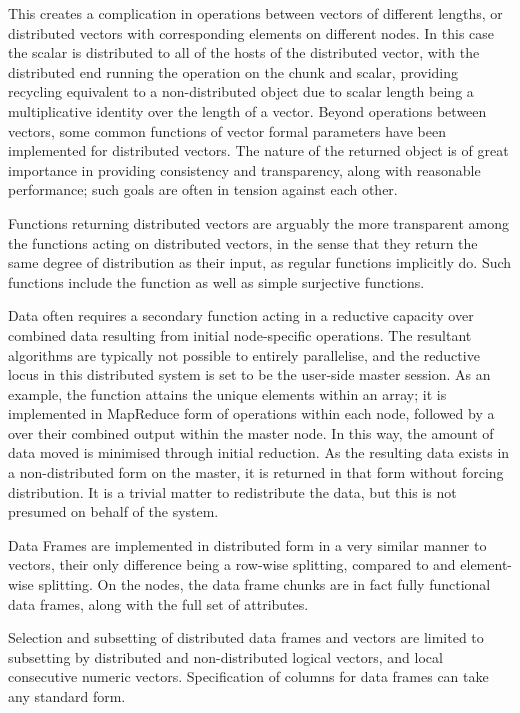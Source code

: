 This creates a complication in operations between vectors of different lengths, or distributed vectors with corresponding elements on different nodes.
In this case the scalar is distributed to all of the hosts of the distributed vector, with the distributed end running the operation on the chunk and scalar, providing recycling equivalent to a non-distributed object due to scalar length being a multiplicative identity over the length of a vector.
Beyond operations between vectors, some common functions of vector formal parameters have been implemented for distributed vectors.
The nature of the returned object is of great importance in providing consistency and transparency, along with reasonable performance; such goals are often in tension against each other.

Functions returning distributed vectors are arguably the more transparent among the functions acting on distributed vectors, in the sense that they return the same degree of distribution as their input, as regular \R{} functions implicitly do.
Such functions include the  function as well as simple surjective functions.

Data often requires a secondary function acting in a reductive capacity over combined data resulting from initial node-specific operations.
The resultant algorithms are typically not possible to entirely parallelise, and the reductive locus in this distributed system is set to be the user-side master \R{} session.
As an example, the  function attains the unique elements within an array; it is implemented in MapReduce form of  operations within each node, followed by a  over their combined output within the master node.
In this way, the amount of data moved is minimised through initial reduction.
As the resulting data exists in a non-distributed form on the master, it is returned in that form without forcing distribution.
It is a trivial matter to redistribute the data, but this is not presumed on behalf of the system.

Data Frames are implemented in distributed form in a very similar manner to vectors, their only difference being a row-wise splitting, compared to and element-wise splitting.
On the nodes, the data frame chunks are in fact fully functional data frames, along with the full set of attributes.

Selection and subsetting of distributed data frames and vectors are limited to subsetting by distributed and non-distributed logical vectors, and local consecutive numeric vectors.
Specification of columns for data frames can take any standard form.

